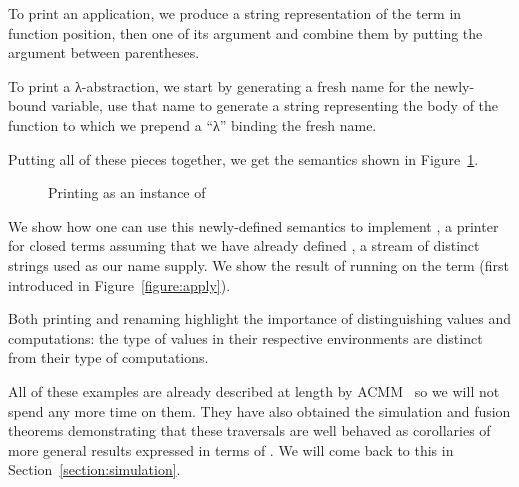 To print an application, we produce a string representation of the term in
function position, then one of its argument and combine them by putting the
argument between parentheses.

\begin{agdasnippet}
\end{agdasnippet}

To print a λ-abstraction, we start by generating a fresh name for the
newly-bound variable, use that name to generate a string representing the
body of the function to which we prepend a ``λ'' binding the fresh name.

\begin{agdasnippet}
\end{agdasnippet}

Putting all of these pieces together, we get the  semantics
shown in Figure~\ref{fig:printing}.

\begin{figure}[h]
\caption{Printing as an instance of \semrec{}}\label{fig:printing}
\end{figure}

We show how one can use this newly-defined semantics to implement ,
a printer for closed terms assuming that we have already defined ,
a stream of distinct strings used as our name supply. We show the result of
running  on the term  (first introduced in
Figure~\ref{figure:apply}).

\begin{minipage}[t]{0.5\textwidth}
\begin{agdasnippet}
\end{agdasnippet}
\end{minipage}
\begin{minipage}[t]{0.4\textwidth}
\begin{agdasnippet}
\end{agdasnippet}
\end{minipage}

Both printing and renaming highlight the importance of distinguishing
values and computations: the type of values in their respective
environments are distinct from their type of computations.

All of these examples are already described at length by ACMM~\citeyear{allais2017type}
so we will not spend any
more time on them. They have also obtained the simulation and fusion
theorems demonstrating that these traversals are well behaved as
corollaries of more general results expressed in terms of \semfun{}.
We will come back to this in Section~\ref{section:simulation}.

